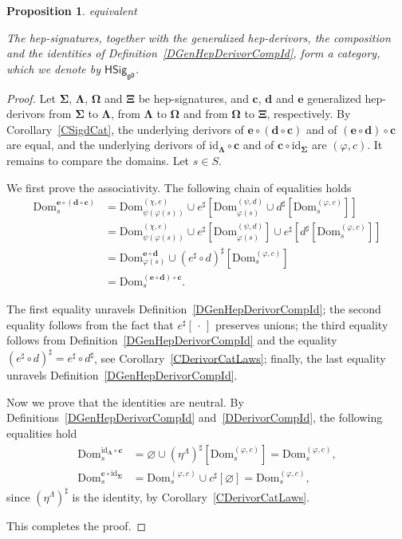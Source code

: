 \documentclass[a4paper, reqno]{amsbook}
\makeatletter
\newcommand{\sig}[1]{\mathbf{#1}}             %
\newcommand{\Dom}{\mathrm{Dom}}
\newcommand{\gd}{\mathfrak{gd}}              %
\newcommand{\id}{\mathrm{id}}
\theoremstyle{plain}
\newtheorem{proposition}[theorem]{Proposition}
\theoremstyle{definition}
\newcommand*{\CA@leanpending}{}
\newcommand*{\CA@leanrelation}{}
\newcommand*{\lean}[2]{%
  \ifcsname\string\color@lean@#1\endcsname\else
    \PackageError{main}{Unknown relation `#1' in \string\lean}{Use equivalent, weaker or stronger.}%
  \fi
  \gdef\CA@leanrelation{#1}%
  \gdef\CA@leanpending{#2}}
\makeatother
\begin{document}
\begin{proposition}\label{PHepSigCat}\lean{equivalent}{instCategoryBundledHepSignature}
The hep-signatures, together with the generalized hep-derivors, the composition and the identities of Definition~\ref{DGenHepDerivorCompId}, form a category, which we denote by $\mathsf{HSig}_{\gd}$.
\end{proposition}
\begin{proof}
Let $\sig{\Sigma}$, $\sig{\Lambda}$, $\sig{\Omega}$ and $\sig{\Xi}$ be hep-signatures, and $\mathbf{c}$, $\mathbf{d}$ and $\mathbf{e}$ generalized hep-derivors from $\sig{\Sigma}$ to $\sig{\Lambda}$, from $\sig{\Lambda}$ to $\sig{\Omega}$ and from $\sig{\Omega}$ to $\sig{\Xi}$, respectively.
By Corollary~\ref{CSigdCat}, the underlying derivors of $\mathbf{e}\circ(\mathbf{d}\circ\mathbf{c})$ and of $(\mathbf{e}\circ\mathbf{d})\circ\mathbf{c}$ are equal, and the underlying derivors of $\id_{\sig{\Lambda}}\circ\mathbf{c}$ and of $\mathbf{c}\circ\id_{\sig{\Sigma}}$ are $(\varphi,c)$.
It remains to compare the domains.
Let $s\in S$.

We first prove the associativity.
The following chain of equalities holds
\begin{align*}
\Dom^{\mathbf{e}\circ(\mathbf{d}\circ\mathbf{c})}_{s}
&=
\Dom^{(\chi,e)}_{\psi(\varphi(s))}\cup e^{\sharp}\left[\Dom^{(\psi,d)}_{\varphi(s)}\cup d^{\sharp}\left[\Dom^{(\varphi,c)}_{s}\right]\right]
\tag{1}
\\&=
\Dom^{(\chi,e)}_{\psi(\varphi(s))}\cup e^{\sharp}\left[\Dom^{(\psi,d)}_{\varphi(s)}\right]\cup e^{\sharp}\left[d^{\sharp}\left[\Dom^{(\varphi,c)}_{s}\right]\right]
\tag{2}
\\&=
\Dom^{\mathbf{e}\circ\mathbf{d}}_{\varphi(s)}\cup\left(e^{\sharp}\circ d\right)^{\sharp}\left[\Dom^{(\varphi,c)}_{s}\right]
\tag{3}
\\&=
\Dom^{(\mathbf{e}\circ\mathbf{d})\circ\mathbf{c}}_{s}.
\tag{4}
\end{align*}

The first equality unravels Definition~\ref{DGenHepDerivorCompId}; the second equality follows from the fact that $e^{\sharp}[\,\cdot\,]$ preserves unions; the third equality follows from Definition~\ref{DGenHepDerivorCompId} and the equality $(e^{\sharp}\circ d)^{\sharp}=e^{\sharp}\circ d^{\sharp}$, see Corollary~\ref{CDerivorCatLaws}; finally, the last equality unravels Definition~\ref{DGenHepDerivorCompId}.

Now we prove that the identities are neutral.
By Definitions~\ref{DGenHepDerivorCompId} and~\ref{DDerivorCompId}, the following equalities hold
\begin{align*}
\Dom^{\id_{\sig{\Lambda}}\circ\mathbf{c}}_{s}
&=\varnothing\cup(\eta^{\Lambda})^{\sharp}\left[\Dom^{(\varphi,c)}_{s}\right]=\Dom^{(\varphi,c)}_{s},
\\
\Dom^{\mathbf{c}\circ\id_{\sig{\Sigma}}}_{s}
&=\Dom^{(\varphi,c)}_{s}\cup c^{\sharp}[\varnothing]=\Dom^{(\varphi,c)}_{s},
\end{align*}
since $(\eta^{\Lambda})^{\sharp}$ is the identity, by Corollary~\ref{CDerivorCatLaws}.

This completes the proof.
\end{proof}
\end{document}
